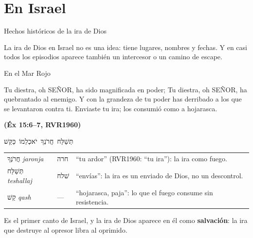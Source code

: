 \documentclass[hyperref={bookmarks=false},aspectratio=169]{beamer}
\newcommand{\heb}[1]{\mbox{\foreignlanguage{hebrew}{#1}}}
\newcommand{\SENOR}{S{\fontsize{0.78em}{1em}\selectfont EÑOR}}
\newcommand{\fuente}[1]{\par\hfill{\upshape\bfseries\footnotesize\textcolor{azul}{#1}}}
\newcommand{\destacar}[1]{\textbf{\textcolor{azul}{#1}}}
\begin{document}
\section{En Israel}

\begin{frame}{Hechos históricos de la ira de Dios}
\centering
{}\par\medskip
\small\RaggedRight La ira de Dios en Israel no es una idea: tiene lugares, nombres y fechas. Y en casi todos los episodios aparece también un intercesor o un camino de escape.
\end{frame}

\begin{frame}{En el Mar Rojo}
\begin{cita}Tu diestra, oh \SENOR, ha sido magnificada en poder; Tu diestra, oh \SENOR, ha quebrantado al enemigo. Y con la grandeza de tu poder has derribado a los que se levantaron contra ti. Enviaste tu ira; los consumió como a hojarasca.\fuente{(Éx 15:6--7, RVR1960)}\end{cita}
\begin{center}\heb{תְּשַׁלַּח חֲרֹנְךָ יֹאכְלֵמוֹ כַּקַּשׁ}\end{center}
\scriptsize\renewcommand{\arraystretch}{1.2}
\begin{tabular}{@{}>{\RaggedRight\arraybackslash}p{2.6cm}>{\RaggedRight\arraybackslash}p{1.2cm}>{\RaggedRight\arraybackslash}p{7.9cm}@{}}
\toprule
\heb{חֲרֹנְךָ} \emph{jaronja} & \heb{חרה} & ``tu ardor'' (RVR1960: ``tu ira''): la ira como fuego. \\
\heb{תְּשַׁלַּח} \emph{teshallaj} & \heb{שׁלח} & ``envías'': la ira es un enviado de Dios, no un descontrol. \\
\heb{קַשׁ} \emph{qash} & --- & ``hojarasca, paja'': lo que el fuego consume sin resistencia. \\
\bottomrule
\end{tabular}\par\medskip
\small\RaggedRight Es el primer canto de Israel, y la ira de Dios aparece en él como \destacar{salvación}: la ira que destruye al opresor libra al oprimido.
\end{frame}
\end{document}
